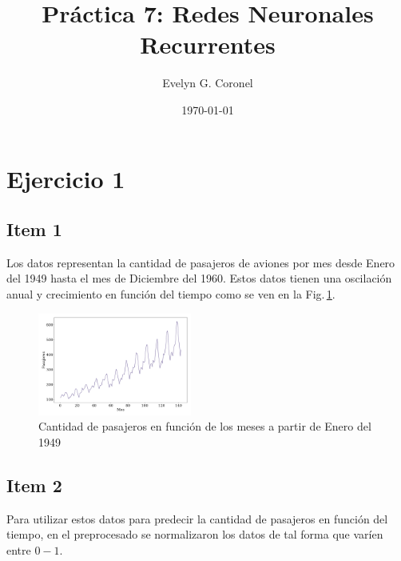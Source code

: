  


\title{Práctica 7: Redes Neuronales Recurrentes }
\author{Evelyn G. Coronel}


\date[]{\lowercase{\today}} 

\maketitle

\section*{Ejercicio 1}
\subsection*{Item 1}

Los datos representan la cantidad de pasajeros de aviones por mes desde Enero del 1949 hasta el mes de Diciembre del 1960. Estos datos tienen una oscilación anual y crecimiento en función del tiempo como se ven en la Fig.\,\ref{fig:datos}.

\begin{figure}[H]
	\begin{small}
		\begin{center}
			\includegraphics[width=0.45\textwidth]{datos.pdf}
		\end{center}
		\caption{Cantidad de pasajeros en función de los meses a partir de Enero del 1949}
		\label{fig:datos}
	\end{small}
\end{figure}


\subsection*{Item 2}

Para utilizar estos datos para predecir la cantidad de pasajeros en función del tiempo, en el preprocesado se normalizaron los datos de tal forma que varíen entre $0-1$. 

